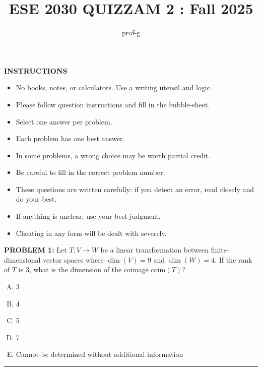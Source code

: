 \documentclass[12pt]{amsart}
\title{ESE 2030 QUIZZAM 2 : Fall 2025}
\author{prof-g}
\newcommand{\divider}{
  \vspace{-1em} %
  \noindent
  \raisebox{-0.15ex}{\textbullet}%
  \hspace{0.5em}%
  \rule[0.5ex]{0.95\textwidth}{1.0pt}%
  \hspace{0.5em}%
  \raisebox{-0.15ex}{\textbullet}%
  \vspace{0em} %
}
\begin{document}
\maketitle

\begin{center}
    {\bf INSTRUCTIONS}
\end{center}

\begin{itemize}
\item 
No books, notes, or calculators. Use a writing utensil and logic. 

\item 
Please follow question instructions and fill in the bubble-sheet. 

\item 
Select one answer per problem.

\item 
Each problem has one best answer. 

\item 
In some problems, a wrong choice may be worth partial credit. 

\item 
Be careful to fill in the correct problem number. 

\item 
These questions are written carefully: if you detect an error, read closely and do your best.

\item 
If anything is unclear, use your best judgment. 

\item 
Cheating in any form will be dealt with severely. 
\end{itemize}

\newpage




{\bf PROBLEM 1:}
Let $T: V \to W$ be a linear transformation between finite-dimensional vector spaces where $\dim(V) = 9$ and $\dim(W) = 4$. 
If the rank of $T$ is $3$, what is the dimension of the coimage $\text{coim}(T)$?
%
\begin{enumerate}[(A)]
\item 3
\item 4
\item 5
\item 7
\item Cannot be determined without additional information
\end{enumerate}
%
%
\divider
\end{document}

